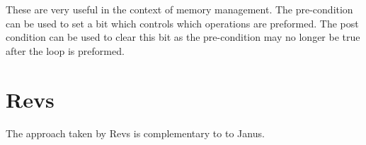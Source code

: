 These are very useful in the context of memory management.
The pre-condition can be used to set a bit which controls which operations are preformed.
The post condition can be used to clear this bit as the pre-condition may no longer be true after the loop is preformed.

\section{Revs}
The approach taken by Revs is complementary to to Janus.



